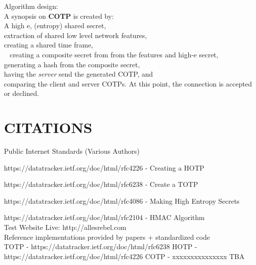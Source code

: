 \documentclass[a4paper, 11pt]{ article}
\begin{document}
\noindent
Algorithm design:\\
A synopsis on \textbf{COTP} is created by:\\
\noindent
A high e, (entropy) shared secret,\\
extraction of shared low level network features,\\
creating a shared time frame,\\ 
creating a composite secret from from the features and high-e secret,\\
generating a hash from the composite secret,\\
having the \textit{server} send the generated COTP, and\\
comparing the client and server COTPs. At this point, the connection is accepted or declined.\\










\section{CITATIONS} %
\noindent
Public Internet Standards (Various Authors)

\noindent
https://datatracker.ietf.org/doc/html/rfc4226 - Creating a HOTP

\noindent
https://datatracker.ietf.org/doc/html/rfc6238 - Create a TOTP 

\noindent
https://datatracker.ietf.org/doc/html/rfc4086 - Making High Entropy Secrets

\noindent
https://datatracker.ietf.org/doc/html/rfc2104 - HMAC Algorithm\\

\noindent
Test Website Live: http://allesrebel.com\\ 

\noindent
Reference implementations provided by papers + standardized code\\
TOTP - https://datatracker.ietf.org/doc/html/rfc6238
HOTP - https://datatracker.ietf.org/doc/html/rfc4226 
COTP - xxxxxxxxxxxxxxx TBA\\
\end{document}
